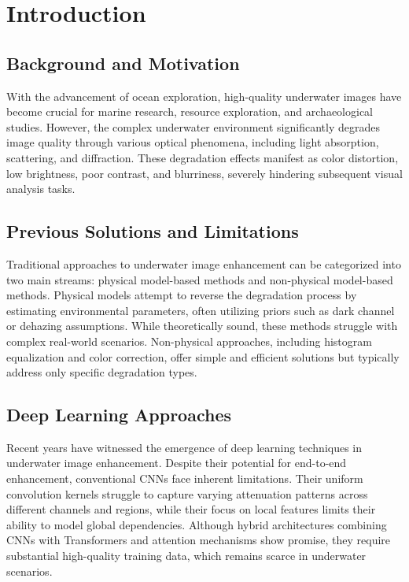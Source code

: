 \documentclass{apmcmthesis}
\begin{document}
\newpage
\tableofcontents

\newpage
\pagestyle{mainmatterstyle}
\setcounter{page}{1}

\section{Introduction}

\subsection{Background and Motivation}
With the advancement of ocean exploration, high-quality underwater images have become crucial for marine research, resource exploration, and archaeological studies. However, the complex underwater environment significantly degrades image quality through various optical phenomena, including light absorption, scattering, and diffraction. These degradation effects manifest as color distortion, low brightness, poor contrast, and blurriness, severely hindering subsequent visual analysis tasks.

\subsection{Previous Solutions and Limitations}
Traditional approaches to underwater image enhancement can be categorized into two main streams: physical model-based methods and non-physical model-based methods. Physical models attempt to reverse the degradation process by estimating environmental parameters, often utilizing priors such as dark channel or dehazing assumptions. \cite{cong2023pugan} While theoretically sound, these methods struggle with complex real-world scenarios. Non-physical approaches, including histogram equalization and color correction, offer simple and efficient solutions but typically address only specific degradation types.

\subsection{Deep Learning Approaches}
Recent years have witnessed the emergence of deep learning techniques in underwater image enhancement. Despite their potential for end-to-end enhancement, conventional CNNs face inherent limitations. Their uniform convolution kernels struggle to capture varying attenuation patterns across different channels and regions, while their focus on local features limits their ability to model global dependencies. \cite{peng2023u} Although hybrid architectures combining CNNs with Transformers and attention mechanisms show promise, they require substantial high-quality training data, which remains scarce in underwater scenarios.
\end{document}
